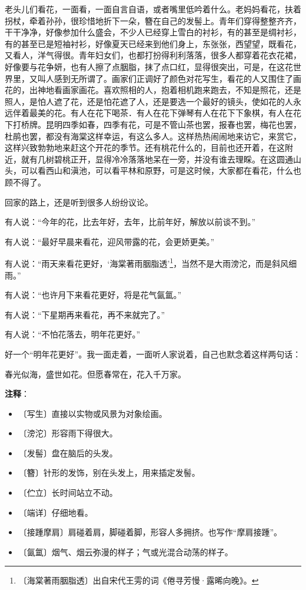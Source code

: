 \documentclass[12pt,UTF-8,openany]{ctexbook}
\begin{document}
\begin{Large}
    老头儿们看花，一面看，一面自言自语，或者嘴里低吟着什么。老妈妈看花，扶着拐杖，牵着孙孙，很珍惜地折下一朵，簪在自己的发髻上。青年们穿得整整齐齐，干干净净，好像参加什么盛会，不少人已经穿上雪白的衬衫，有的甚至是绸衬衫，有的甚至已是短袖衬衫，好像夏天已经来到他们身上，东张张，西望望，既看花，又看人，洋气得很。青年妇女们，也都打扮得利利落落，很多人都穿着花衣花裙，好像要与花争妍，也有人擦了点胭脂，抹了点口红，显得很突出，可是，在这花世界里，又叫人感到无所谓了。画家们正调好了颜色对花写生，看花的人又围住了画花的，出神地看画家画花。喜欢照相的人，抱着相机跑来跑去，不知是照花，还是照人，是怕人遮了花，还是怕花遮了人，还是要选一个最好的镜头，使如花的人永远伴着最美的花。有人在花下喝茶．有人在花下弹琴有人在花下下象棋，有人在花下打桥牌。昆明四季如春，四季有花，可是不管山茶也罢，报春也罢，梅花也罢，杜鹃也罢，都没有海棠这样幸运，有这么多人。这样热热闹闹地来访它，来赏它，这样兴致勃勃地来赶这个开花的季节。还有桃花什么的，目前也还开着，在这附近，就有几树碧桃正开，显得冷冷落落地呆在一旁，并没有谁去理睬。在这圆通山头，可以看西山和滇池，可以看平林和原野，可是这时候，大家都在看花，什么也顾不得了。
    
    回家的路上，还是听到很多人纷纷议论。
    
    有人说：“今年的花，比去年好，去年，比前年好，解放以前谈不到。”
    
    有人说：“最好早晨来看花，迎风带露的花，会更娇更美。”
    
    有人说：“雨天来看花更好，‘海棠著雨胭脂透’\footnote{〔海棠著雨胭脂透〕出自宋代王雱的词《倦寻芳慢·露晞向晚》。}，当然不是大雨滂沱，而是斜风细雨。”
    
    有人说：“也许月下来看花更好，将是花气氤氲。”
    
    有人说：“下星期再来看花，再不来就完了。”
    
    有人说：“不怕花落去，明年花更好。”
    
    好一个“明年花更好”。我一面走着，一面听人家说着，自己也默念着这样两句话：
    
    春光似海，盛世如花。但愿春常在，花入千万家。
    
\end{Large}


\newpage

\textbf{注释}：

\vspace{-1em}

\begin{itemize}
    \setlength\itemsep{-0.2em}
    \item 〔写生〕直接以实物或风景为对象绘画。
    \item 〔滂沱〕形容雨下得很大。
    \item 〔发髻〕盘在脑后的头发。
    \item 〔簪〕针形的发饰，别在头发上，用来插定发髻。
    \item 〔伫立〕长时间站立不动。
    \item 〔端详〕仔细地看。
    \item 〔接踵摩肩〕肩碰着肩，脚碰着脚，形容人多拥挤。也写作“摩肩接踵”。
    \item 〔氤氲〕烟气、烟云弥漫的样子；气或光混合动荡的样子。
\end{itemize}
\end{document}
